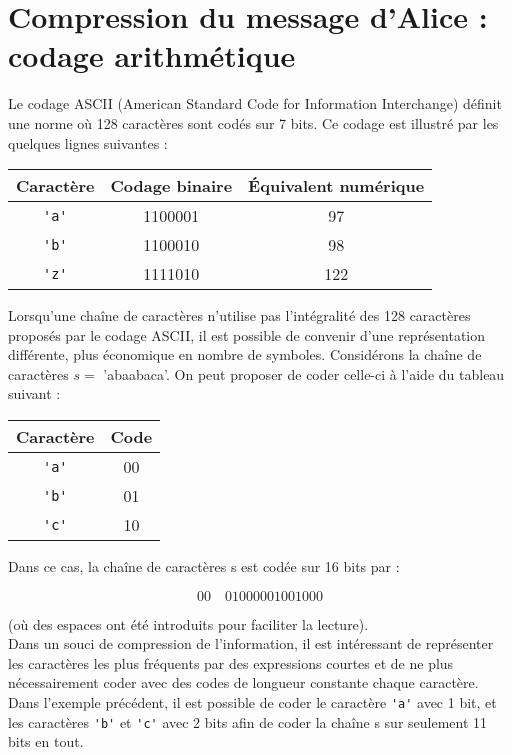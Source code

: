 \section{Compression du message d'Alice : codage arithmétique}
Le codage ASCII (American Standard Code for Information Interchange) définit une norme où 128 caractères sont codés sur 7 bits. Ce codage est illustré par les quelques lignes suivantes :

\begin{center}
\begin{tabular}{|c|c|c|}
\hline
Caractère & Codage binaire & Équivalent numérique \\
\hline
\lstinline{'a'} & 1100001 & 97 \\
\hline
\lstinline{'b'} & 1100010 & 98 \\
\hline
\lstinline{'z'} & 1111010 & 122 \\
\hline
\end{tabular}
\end{center}

Lorsqu'une chaîne de caractères n'utilise pas l'intégralité des 128 caractères proposés par le codage ASCII, il est possible de convenir d'une représentation différente, plus économique en nombre de symboles. Considérons la chaîne de caractères $s=$ 'abaabaca'. On peut proposer de coder celle-ci à l'aide du tableau suivant :

\begin{center}
\begin{tabular}{|c|c|}
\hline
Caractère & Code \\
\hline
\lstinline{'a'} & 00 \\
\hline
\lstinline{'b'} & 01 \\
\hline
\lstinline{'c'} & 10 \\
\hline
\end{tabular}
\end{center}

Dans ce cas, la chaîne de caractères s est codée sur 16 bits par :

$$
00 \quad 01000001001000
$$

(où des espaces ont été introduits pour faciliter la lecture).\\
Dans un souci de compression de l'information, il est intéressant de représenter les caractères les plus fréquents par des expressions courtes et de ne plus nécessairement coder avec des codes de longueur constante chaque caractère. Dans l'exemple précédent, il est possible de coder le caractère \lstinline{'a'} avec 1 bit, et les caractères \lstinline{'b'} et \lstinline{'c'} avec 2 bits afin de coder la chaîne s sur seulement 11 bits en tout.


